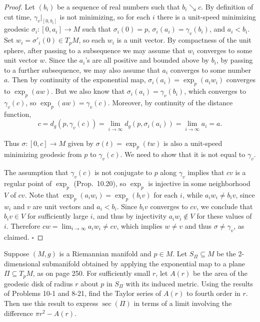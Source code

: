\begin{proof}
Let $(b_i)$ be a sequence of real numbers such that $b_i \searrow c$. By definition of cut time, $\gamma_v|_{[0,b_i]}$ is not minimizing, so for each $i$ there is a unit-speed minimizing geodesic $\sigma_i: [0,a_i] \to M$ such that $\sigma_i(0) = p$, $\sigma_i(a_i) = \gamma_v(b_i)$, and $a_i < b_i$. Set $w_i = \sigma'_i(0) \in T_p M$, so each $w_i$ is a unit vector. By compactness of the unit sphere, after passing to a subsequence we may assume that $w_i$ converges to some unit vector $w$. Since the $a_i$'s are all positive and bounded above by $b_i$, by passing to a further subsequence, we may also assume that $a_i$ converges to some number $a$. Then by continuity of the exponential map, $\sigma_i(a_i) = \exp_p(a_i w_i)$ converges to $\exp_p(aw)$. But we also know that $\sigma_i(a_i) = \gamma_v(b_i)$, which converges to $\gamma_v(c)$, so $\exp_p(aw) = \gamma_v(c)$. Moreover, by continuity of the distance function,
\[c = d_g(p, \gamma_v(c)) = \lim_{i \to \infty} d_g(p, \sigma_i(a_i)) = \lim_{i \to \infty} a_i = a.\]

Thus $\sigma: [0,c] \to M$ given by $\sigma(t) = \exp_p(tw)$ is also a unit-speed minimizing geodesic from $p$ to $\gamma_v(c)$. We need to show that it is not equal to $\gamma_v$.

The assumption that $\gamma_v(c)$ is not conjugate to $p$ along $\gamma_v$ implies that $cv$ is a regular point of $\exp_p$ (Prop.\ 10.20), so $\exp_p$ is injective in some neighborhood $V$ of $cv$. Note that $\exp_p(a_i w_i) = \exp_p(b_i v)$ for each $i$, while $a_i w_i \ne b_i v$, since $w_i$ and $v$ are unit vectors and $a_i < b_i$. Since $b_i v$ converges to $cv$, we conclude that $b_i v \in V$ for sufficiently large $i$, and thus by injectivity $a_i w_i \notin V$ for these values of $i$. Therefore $cw = \lim_{i \to \infty} a_i w_i \ne cv$, which implies $w \ne v$ and thus $\sigma \ne \gamma_v$, as claimed. $\square$
\end{proof}

\begin{exercise}\label{prob:area-geodesic-disk}
Suppose $(M, g)$ is a Riemannian manifold and $p \in M$. Let $S_\Pi \subseteq M$ be the 2-dimensional submanifold obtained by applying the exponential map to a plane $\Pi \subseteq T_p M$, as on page 250. For sufficiently small $r$, let $A(r)$ be the area of the geodesic disk of radius $r$ about $p$ in $S_\Pi$ with its induced metric. Using the results of Problems 10-1 and 8-21, find the Taylor series of $A(r)$ to fourth order in $r$. Then use this result to express $\sec(\Pi)$ in terms of a limit involving the difference $\pi r^2 - A(r)$.
\end{exercise}

